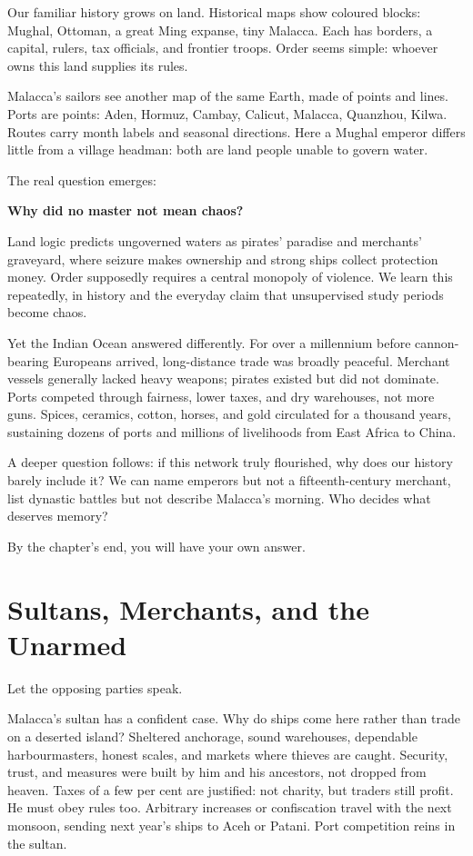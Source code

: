 Our familiar history grows on land. Historical maps show coloured blocks: Mughal, Ottoman, a great Ming expanse, tiny Malacca. Each has borders, a capital, rulers, tax officials, and frontier troops. Order seems simple: whoever owns this land supplies its rules.

Malacca's sailors see another map of the same Earth, made of points and lines. Ports are points: Aden, Hormuz, Cambay, Calicut, Malacca, Quanzhou, Kilwa. Routes carry month labels and seasonal directions. Here a Mughal emperor differs little from a village headman: both are land people unable to govern water.

The real question emerges:

\textbf{Why did no master not mean chaos?}

Land logic predicts ungoverned waters as pirates' paradise and merchants' graveyard, where seizure makes ownership and strong ships collect protection money. Order supposedly requires a central monopoly of violence. We learn this repeatedly, in history and the everyday claim that unsupervised study periods become chaos.

Yet the Indian Ocean answered differently. For over a millennium before cannon-bearing Europeans arrived, long-distance trade was broadly peaceful. Merchant vessels generally lacked heavy weapons; pirates existed but did not dominate. Ports competed through fairness, lower taxes, and dry warehouses, not more guns. Spices, ceramics, cotton, horses, and gold circulated for a thousand years, sustaining dozens of ports and millions of livelihoods from East Africa to China.

A deeper question follows: if this network truly flourished, why does our history barely include it? We can name emperors but not a fifteenth-century merchant, list dynastic battles but not describe Malacca's morning. Who decides what deserves memory?

By the chapter's end, you will have your own answer.

\section{Sultans, Merchants, and the Unarmed}
Let the opposing parties speak.

Malacca's sultan has a confident case. Why do ships come here rather than trade on a deserted island? Sheltered anchorage, sound warehouses, dependable harbourmasters, honest scales, and markets where thieves are caught. Security, trust, and measures were built by him and his ancestors, not dropped from heaven. Taxes of a few per cent are justified: not charity, but traders still profit. He must obey rules too. Arbitrary increases or confiscation travel with the next monsoon, sending next year's ships to Aceh or Patani. Port competition reins in the sultan.

